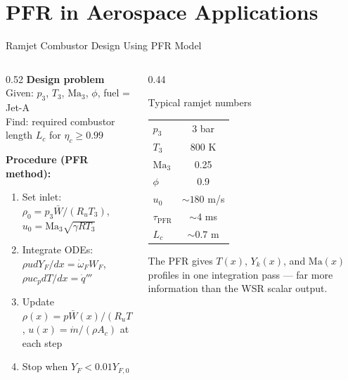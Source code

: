 \documentclass[12pt,aspectratio=169]{beamer}
\newcommand{\mdot}{\dot{m}}
\newcommand{\Ma}{\mathrm{Ma}}
\newcommand{\Ac}{A_c}
\newcommand{\taupfr}{\tau_{\text{PFR}}}
\newcommand{\wdot}{\dot{\omega}}
\begin{document}
\section{PFR in Aerospace Applications}

\begin{frame}{Ramjet Combustor Design Using PFR Model}

  \begin{columns}[t]
    \begin{column}{0.52\textwidth}
      \textbf{Design problem}\\[4pt]
      Given: $p_3$, $T_3$, $\Ma_3$, $\phi$, fuel = Jet-A\\
      Find: required combustor length $L_c$ for $\eta_c \geq 0.99$

      \medskip
      \textbf{Procedure (PFR method):}
      \begin{enumerate}
        \item Set inlet: $\rho_0 = p_3\bar{W}/(R_u T_3)$,
              $u_0 = \Ma_3 \sqrt{\gamma R T_3}$
        \item Integrate ODEs:
              $\rho u dY_F/dx = \wdot_F W_F$,
              $\rho u c_p dT/dx = \dot{q}'''$
        \item Update $\rho(x) = p\bar{W}(x)/(R_u T(x))$,
              $u(x) = \mdot / (\rho \Ac)$ at each step
        \item Stop when $Y_F < 0.01 Y_{F,0}$
      \end{enumerate}
    \end{column}
    \begin{column}{0.44\textwidth}
      \begin{exampleblock}{Typical ramjet numbers}
        \begin{tabular}{lc}
          $p_3$ & 3 bar \\
          $T_3$ & 800 K \\
          $\Ma_3$ & 0.25 \\
          $\phi$ & 0.9 \\
          $u_0$ & $\sim 180$ m/s \\
          $\taupfr$ & $\sim 4$ ms \\
          $L_c$ & $\sim 0.7$ m \\
        \end{tabular}
      \end{exampleblock}
      \medskip
      The PFR gives $T(x)$, $Y_k(x)$, and $\Ma(x)$
      profiles in one integration pass ---
      far more information than the WSR scalar output.
    \end{column}
  \end{columns}
\end{frame}
\end{document}
